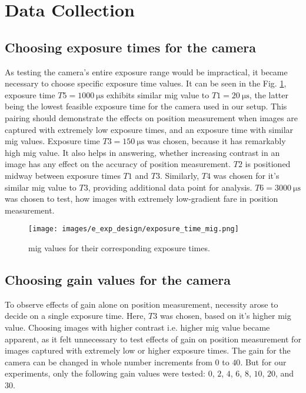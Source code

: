 \section{Data Collection}\label{section:data_collection}
\subsection*{Choosing exposure times for the camera}
As testing the camera's entire exposure range would be impractical, it became necessary to choose specific exposure time values. It can be seen in the Fig. \ref{fig:exposure_time_mig.png}, exposure time $T5=\SI{1000}{\micro\second}$ exhibits similar \gls{mig} value to $T1=\SI{20}{\micro\second}$, the latter being the lowest feasible exposure time for the camera used in our setup. This pairing should demonstrate the effects on position measurement when images are captured with extremely low exposure times, and an exposure time with similar \gls{mig} values. Exposure time $T3=\SI{150}{\micro\second}$ was chosen, because it has remarkably high \gls{mig} value. It also helps in answering, whether increasing contrast in an image has any effect on the accuracy of position measurement. $T2$ is positioned midway between exposure times $T1$ and $T3$. Similarly, $T4$ was chosen for it's similar \gls{mig} value to $T3$, providing additional data point for analysis. $T6=\SI{3000}{\micro\second}$ was chosen to test, how images with extremely low-gradient fare in position measurement.

\begin{figure}[h]
    \centering
    \texttt{[image: images/e\_exp\_design/exposure\_time\_mig.png]}
    \caption{\gls{mig} values for their corresponding exposure times.}
    \label{fig:exposure_time_mig.png}
\end{figure}

\subsection*{Choosing gain values for the camera}
To observe effects of gain alone on position measurement, necessity arose to decide on a single exposure time. Here, $T3$ was chosen, based on it's higher \gls{mig} value. Choosing images with higher contrast i.e. higher \gls{mig} value became apparent, as it felt unnecessary to test effects of gain on position measurement for images captured with extremely low or higher exposure times. The gain for the camera can be changed in whole number increments from $0$ to $40$. But for our experiments, only the following gain values were tested: $0$, $2$, $4$, $6$, $8$, $10$, $20$, and $30$. 

